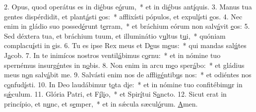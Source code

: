 2. Opus, quod operátus es in di\uline{é}bus e\uline{ó}rum,~* et in di\uline{é}bus ant\uline{í}quis.
3. Manus tua gentes dispérdidit, et plant\uline{á}sti \uline{e}os:~* afflixísti pópulos, et expul\uline{í}sti \uline{e}os.
4. Nec enim in gládio suo possed\uline{é}runt t\uline{e}rram,~* et bráchium eórum non salv\uline{á}vit \uline{e}os:
5. Sed déxtera tua, et bráchium tuum, et illuminátio v\uline{u}ltus t\uline{u}i,~* quóniam complacu\uline{í}sti in \uline{e}is.
6. Tu es ipse Rex meus et D\uline{e}us m\uline{e}us:~* qui mandas sal\uline{ú}tes J\uline{a}cob.
7. In te inimícos nostros ventil\uline{á}bimus c\uline{o}rnu:~* et in nómine tuo spernémus insurg\uline{é}ntes in n\uline{o}bis.
8. Non enim in arcu m\uline{e}o sper\uline{á}bo:~* et gládius meus n\uline{o}n salv\uline{á}bit me.
9. Salvásti enim nos de afflig\uline{é}ntib\uline{u}s nos:~* et odiéntes nos c\uline{o}nfud\uline{í}sti.
10. In Deo laudábimur t\uline{o}ta d\uline{i}e:~* et in nómine tuo confitébim\uline{u}r in s\uline{ǽ}culum.
11. Glória Patri, et F\uline{í}l\uline{i}o,~* et Spir\uline{í}tui S\uline{a}ncto.
12. Sicut erat in princípio, et n\uline{u}nc, et s\uline{e}mper,~* et in sǽcula sæcul\uline{ó}rum. \uline{A}men.
